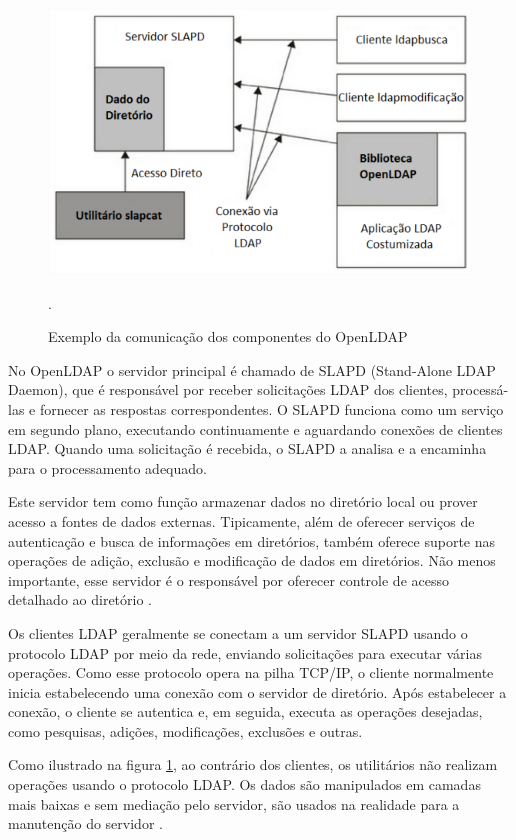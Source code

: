 \begin{figure}[h]
    \centering
	\includegraphics[scale=0.9]{textuais/ComunicacaoLDAP.png}
	\caption[Exemplo da comunicação dos componentes do OpenLDAP]{Exemplo da comunicação dos componentes do OpenLDAP \cite{lima2021estudo}}.
	\label{fig:compLDAP}
\end{figure}

No OpenLDAP o servidor principal é chamado de SLAPD (Stand-Alone LDAP Daemon), que é responsável por receber solicitações LDAP dos clientes, processá-las e fornecer as respostas correspondentes. O SLAPD funciona como um serviço em segundo plano, executando continuamente e aguardando conexões de clientes LDAP. Quando uma solicitação é recebida, o SLAPD a analisa e a encaminha para o processamento adequado. 

Este servidor tem como função armazenar dados no diretório local ou prover acesso a fontes de dados externas. Tipicamente, além de oferecer serviços de autenticação e busca de informações em diretórios, também oferece suporte nas operações de adição, exclusão e modificação de dados em diretórios. Não menos importante, esse servidor é o responsável por oferecer controle de acesso detalhado ao diretório \cite{universidade-fumec}.

Os clientes LDAP geralmente se conectam a um servidor SLAPD usando o protocolo LDAP por meio da rede, enviando solicitações para executar várias operações. Como esse protocolo opera na pilha TCP/IP, o cliente normalmente inicia estabelecendo uma conexão com o servidor de diretório. Após estabelecer a conexão, o cliente se autentica e, em seguida, executa as operações desejadas, como pesquisas, adições, modificações, exclusões e outras.

Como ilustrado na figura \ref{fig:compLDAP}, ao contrário dos clientes, os utilitários não realizam operações usando o protocolo LDAP. Os dados são manipulados em camadas mais baixas e sem mediação pelo servidor, são usados na realidade para a manutenção do servidor \cite{lima2021estudo}.

